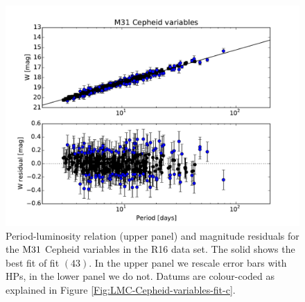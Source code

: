 \begin{figure}[hbtp]
\centering
\includegraphics[width=\textwidth]{figures/chapter-h0/effective_HP_cepheids_M31_R16.pdf}
\caption{Period-luminosity relation (upper panel) and magnitude residuals for the $\mathrm{M31}$ Cepheid variables in the R16 data set. The solid  shows the best fit of fit $(43)$. In the upper panel we rescale error bars with HPs, in the lower panel we do not. Datums are colour-coded as explained in Figure \ref{Fig:LMC-Cepheid-variables-fit-c}.}
\label{Fig:R16-M31}
\end{figure}

